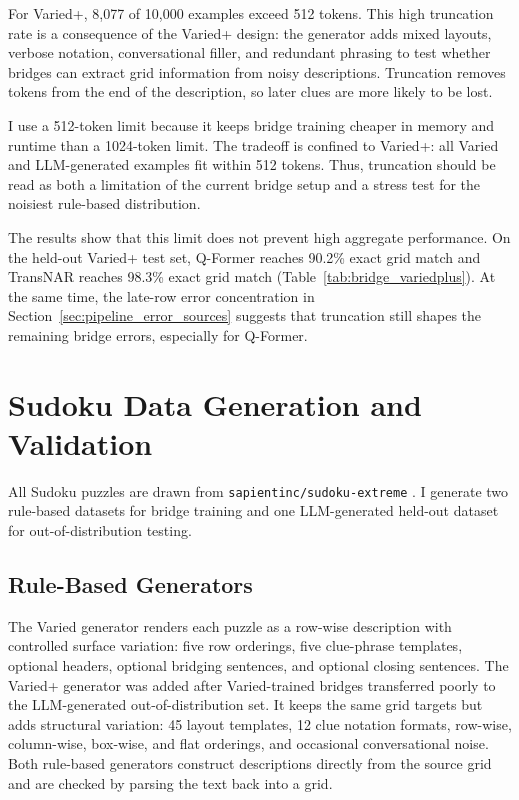 \documentclass[11pt]{article}
\begin{document}
For Varied+, 8,077 of 10,000 examples exceed 512 tokens.
This high truncation rate is a consequence of the Varied+ design: the generator adds mixed layouts, verbose notation, conversational filler, and redundant phrasing to test whether bridges can extract grid information from noisy descriptions.
Truncation removes tokens from the end of the description, so later clues are more likely to be lost.

I use a 512-token limit because it keeps bridge training cheaper in memory and runtime than a 1024-token limit.
The tradeoff is confined to Varied+: all Varied and LLM-generated examples fit within 512 tokens.
Thus, truncation should be read as both a limitation of the current bridge setup and a stress test for the noisiest rule-based distribution.

The results show that this limit does not prevent high aggregate performance.
On the held-out Varied+ test set, Q-Former reaches 90.2\% exact grid match and TransNAR reaches 98.3\% exact grid match (Table~\ref{tab:bridge_variedplus}).
At the same time, the late-row error concentration in Section~\ref{sec:pipeline_error_sources} suggests that truncation still shapes the remaining bridge errors, especially for Q-Former.

\section{Sudoku Data Generation and Validation}
\label{app:nl_transformations}

All Sudoku puzzles are drawn from \texttt{sapientinc/sudoku-extreme} \cite{SapientincSudokuextremeDatasets}.
I generate two rule-based datasets for bridge training and one LLM-generated held-out dataset for out-of-distribution testing.

\subsection{Rule-Based Generators}
\label{app:nl_varied}
\label{app:nl_variedplus}

The Varied generator renders each puzzle as a row-wise description with controlled surface variation: five row orderings, five clue-phrase templates, optional headers, optional bridging sentences, and optional closing sentences.
The Varied+ generator was added after Varied-trained bridges transferred poorly to the LLM-generated out-of-distribution set.
It keeps the same grid targets but adds structural variation: 45 layout templates, 12 clue notation formats, row-wise, column-wise, box-wise, and flat orderings, and occasional conversational noise.
Both rule-based generators construct descriptions directly from the source grid and are checked by parsing the text back into a grid.
\end{document}
